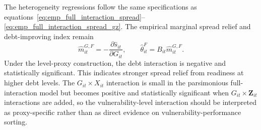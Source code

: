 The heterogeneity regressions follow the same specifications as equations~\eqref{eq:emp_full_interaction_spread}--\eqref{eq:emp_full_interaction_spread_gz}. The empirical marginal spread relief and debt-improving index remain
\begin{equation}
\widehat m^{G,F}_{it}
=
-
\frac{\partial \widehat s_{it}}{\partial G_{it}},
\qquad
\widehat\theta^F_{it}
=
B_{it}\widehat m^{G,F}_{it}.
\label{eq:appc_theta}
\end{equation}
Under the level-proxy construction, the debt interaction is negative and statistically significant. This indicates stronger spread relief from readiness at higher debt levels. The $G_{it}\times X_{it}$ interaction is small in the parsimonious full-interaction model but becomes positive and statistically significant when $G_{it}\times\mathbf{Z}_{it}$ interactions are added, so the vulnerability-level interaction should be interpreted as proxy-specific rather than as direct evidence on vulnerability-performance sorting.

